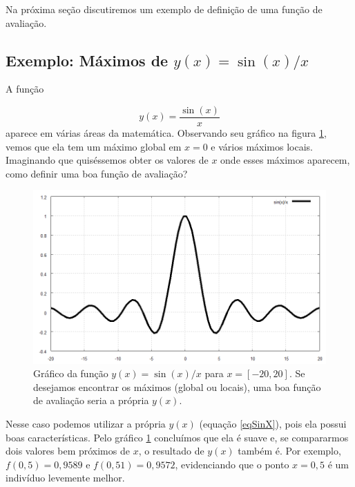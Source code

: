 	Na próxima seção discutiremos um exemplo de definição de uma função de avaliação.
		
	\subsection{\label{MaxSeno}Exemplo: Máximos de $y(x) = \sin(x) / x$}
	
	A função
	
	\begin{equation}\label{eqSinX}
		y(x) = \frac{\sin(x)}{x}
	\end{equation}
	aparece em várias áreas da matemática. Observando seu gráfico na figura \ref{figSen}, vemos que ela tem um máximo global em $x = 0$ e vários máximos locais. Imaginando que quiséssemos obter os valores de $x$ onde esses máximos aparecem, como definir uma boa função de avaliação?
	
	\begin{figure}[htp]
		\begin{center}
			\includegraphics[width=13cm]{figs/ga/sen_x__x.png}
		\end{center}
		\caption{\label{figSen}Gráfico da função $y(x) = \sin(x) / x$ para $x = [-20,20]$. Se desejamos encontrar os máximos (global ou locais), uma boa função de avaliação seria a própria $y(x)$.}
	\end{figure}
		
	Nesse caso podemos utilizar a própria $y(x)$ (equação \ref{eqSinX}), pois ela possui boas características. Pelo gráfico \ref{figSen} concluímos que ela é suave e, se compararmos dois valores bem próximos de $x$, o resultado de $y(x)$ também é. Por exemplo, $f(0,5) = 0,9589$ e $f(0,51) = 0,9572$, evidenciando que o ponto $x = 0,5$ é um indivíduo levemente melhor.
	
